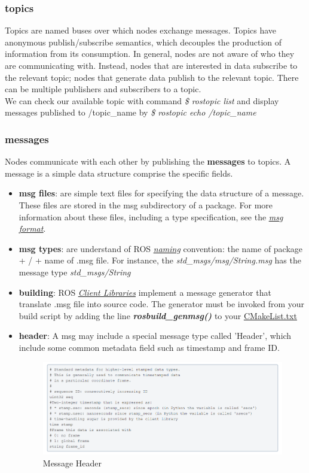 \documentclass{report}
\begin{document}
\subsubsection{topics}
Topics are named buses over which nodes exchange messages. Topics have anonymous publish/subscribe semantics, which decouples the production of information from its consumption. In general, nodes are not aware of who they are communicating with. Instead, nodes that are interested in data subscribe to the relevant topic; nodes that generate data publish to the relevant topic. There can be multiple publishers and subscribers to a topic.
\\We can check our available topic with command \textit{\$ rostopic list} and display messages published to /topic\_name by \textit{\$ rostopic echo /topic\_name}
\subsubsection{messages}
Nodes communicate with each other by publishing the \textbf{messages} to topics. A message is a simple data structure comprise the specific fields.
\begin{itemize}
    \item \textbf{msg files}: are simple text files for specifying the data structure of a message. These files are stored in the msg subdirectory of a package. For more information about these files, including a type specification, see the \textit{\href{https://wiki.ros.org/msg}{\underline{msg format}}}.
    \item \textbf{msg types}: are understand of ROS \textit{\href{https://wiki.ros.org/Names}{\underline{naming}}} convention: the name of package + / + name of .msg file. For instance, the \textit{std\_msgs/msg/String.msg} has the message type \textit{std\_msgs/String}
    \item \textbf{building}: ROS \textit{\href{http://wiki.ros.org/Client\%20Libraries} {\underline{Client Libraries}}} implement a message generator that translate .msg file into source code.
    The generator must be invoked from your build script by adding the line
    \textbf{\textit{rosbuild\_genmsg()}} to your
    \href{https://wiki.ros.org/action/show/rosbuild/CMakeLists?action=show&redirect=CMakeLists}{\underline{CMakeList.txt}}
    \item \textbf{header}: A msg may include a special message type called 'Header', which include some common metadata field such as timestamp and frame ID.
    \begin{figure}[H]
        \centering
        \includegraphics[width=\textwidth]{Images/msgheader.png}
        \caption{Message Header}
        \label{fig:my_label}
    \end{figure}
\end{itemize}
\end{document}

